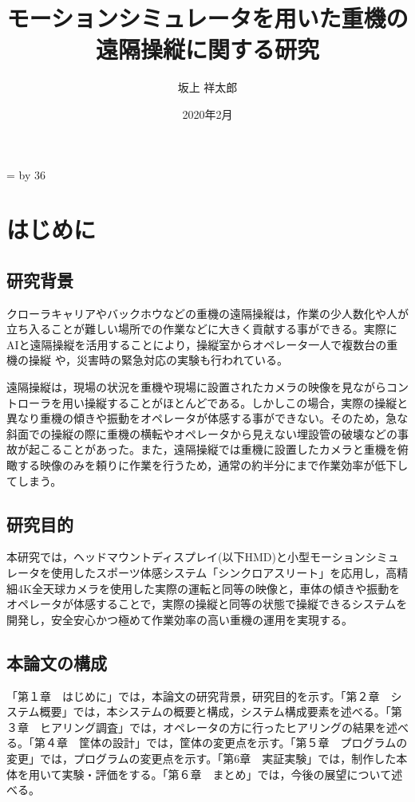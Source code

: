 \documentclass[10pt,a4paper]{jsarticle}
\title{モーションシミュレータを用いた重機の遠隔操縦に関する研究} %
\date{2020年2月} %
\author{坂上 祥太郎} %
\def\linesparpage#1{
    \baselineskip=\textheight
    \divide\baselineskip by #1
}
\begin{document}
\linesparpage{36} %

\begin{titlepage}
\maketitle
\thispagestyle{empty}
\end{titlepage}

\tableofcontents
\thispagestyle{empty}
\clearpage

\setcounter{page}{1}
\pagestyle{plain}

\section{はじめに}

\subsection{研究背景}
クローラキャリアやバックホウなどの重機の遠隔操縦は，作業の少人数化や人が立ち入ることが難しい場所での作業などに大きく貢献する事ができる。実際にAIと遠隔操縦を活用することにより，操縦室からオペレータ一人で複数台の重機の操縦 \cite{kumagai_AI}や，災害時の緊急対応の実験\cite{kumagai_mujin}も行われている。

遠隔操縦は，現場の状況を重機や現場に設置されたカメラの映像を見ながらコントローラを用い操縦することがほとんどである。しかしこの場合，実際の操縦と異なり重機の傾きや振動をオペレータが体感する事ができない。そのため，急な斜面での操縦の際に重機の横転やオペレータから見えない埋設管の破壊などの事故が起こることがあった。また，遠隔操縦では重機に設置したカメラと重機を俯瞰する映像のみを頼りに作業を行うため，通常の約半分にまで作業効率が低下してしまう。\cite{nec}

\subsection{研究目的}
本研究では，ヘッドマウントディスプレイ(以下HMD)と小型モーションシミュレータを使用したスポーツ体感システム「シンクロアスリート」を応用し，高精細4K全天球カメラを使用した実際の運転と同等の映像と，車体の傾きや振動をオペレータが体感することで，実際の操縦と同等の状態で操縦できるシステムを開発し，安全安心かつ極めて作業効率の高い重機の運用を実現する。

\subsection{本論文の構成}
「第１章　はじめに」では，本論文の研究背景，研究目的を示す。「第２章　システム概要」では，本システムの概要と構成，システム構成要素を述べる。「第３章　ヒアリング調査」では，オペレータの方に行ったヒアリングの結果を述べる。「第４章　筐体の設計」では，筐体の変更点を示す。「第５章　プログラムの変更」では，プログラムの変更点を示す。「第6章　実証実験」では，制作した本体を用いて実験・評価をする。「第６章　まとめ」では，今後の展望について述べる。
\end{document}
